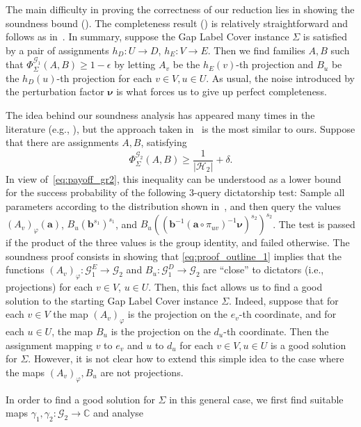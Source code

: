 \documentclass[a4paper,11pt]{article}
\theoremstyle{definition}
\newcommand{\tuple}[1]{{\mathbf{#1}}}
\newcommand{\cc}{\mathbb{C}}
\newcommand{\gr}{\mathscr{G}}
\newcommand{\sgr}{\mathscr{H}}
\begin{document}
The main difficulty in proving the correctness of our reduction lies in showing the soundness bound (). The completeness result () is relatively straightforward and follows as in~\cite{EHR04:tcs}. In summary, suppose the Gap Label Cover instance $\Sigma$ is satisfied by a pair of assignments $h_D: U \rightarrow D$, 
$h_E: V\rightarrow E$. Then we find families $A,B$ such that $\Phi^{\gr_1}_\Sigma(A, B)\geq 1 - \epsilon$ by letting $A_v$ be the $h_E(v)$-th projection and $B_u$
be the $h_D(u)$-th projection for each $v\in V, u\in U$. As usual, the noise introduced by the perturbation factor $\bm{\nu}$ is what forces us to give up perfect completeness.\par
The idea behind our soundness analysis has appeared many times in the literature (e.g., \cite{Hastad01:jacm,EHR04:tcs,Bhangale21:stoc}), but the approach taken in~\cite{EHR04:tcs} is the most similar to ours. 
Suppose that there are assignments $A, B$, satisfying 
\begin{equation}
\label{eq:proof_outline_1}
\Phi_\Sigma^{\gr_2}(A, B)\geq 
\frac{1}{|\sgr_2|} + \delta.
\end{equation}
In view of~\eqref{eq:payoff_gr2}, this inequality
can be understood as a lower bound for the success probability of the following $3$-query dictatorship test: Sample all parameters
according to the distribution shown in~, and then
query the values $(A_v)_\varphi(\tuple{a})$, $B_u(\tuple{b}^{s_1})^{s_1}$, and
$B_u((\tuple{b}^{-1} (\tuple{a} \circ \pi_{uv})^{-1}\bm{\nu})^{s_2})^{s_2}$. The test
is passed if the product of the three values is the group identity, and failed
otherwise. 
The soundness proof consists in showing that \eqref{eq:proof_outline_1}
implies that the functions $(A_v)_{\varphi}: \gr_1^E \rightarrow \gr_2$ 
and $B_u: \gr_1^D \rightarrow \gr_2$ are ``close'' to dictators (i.e.,
projections) for each $v\in V$, $u\in U$. Then, this fact allows us to find a
good solution to the starting Gap Label Cover instance $\Sigma$. Indeed, suppose that for each $v\in V$ the map $(A_v)_{\varphi}$
is the projection on the $e_v$-th coordinate, and for each $u\in U$, the map $B_u$ is the projection on the $d_u$-th coordinate. Then the assignment mapping $v$ to $e_v$ and $u$ to $d_u$ for each $v\in V, u\in U$ is a good solution for $\Sigma$. However, it is not clear how to extend this simple idea to the case where the maps $(A_v)_\varphi, B_u$ are not projections. \par
In order to find a good solution for $\Sigma$ in this general case, we first find suitable maps $\gamma_1, \gamma_2:\gr_2 \rightarrow \cc$ and analyse 
\end{document}
